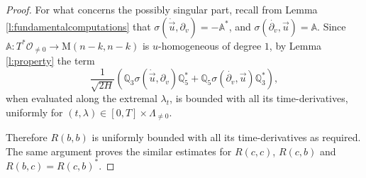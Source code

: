 \documentclass[11pt,a4paper]{article}
\theoremstyle{plain}
\theoremstyle{definition}
\theoremstyle{remark}
\numberwithin{equation}{section}
\newcommand{\A}{\mathbb{A}}
\newcommand{\Q}{\mathbb{Q}}
\begin{document}
\begin{proof}
For what concerns the possibly singular part, recall from Lemma \ref{l:fundamentalcomputations} that $\sigma(\dot{\vec{u}},\partial_v) = -\A^*$, and $\sigma(\dot{\partial_v},\vec{u}) = \A$. Since $\A : T^*\mathcal{O}_{\neq 0} \to \mathrm{M}(n-k,n-k)$ is $u$-homogeneous of degree $1$, by Lemma \ref{l:property} the term
\begin{equation}
\frac{1}{\sqrt{2H}}\left(\Q_3 \sigma(\dot{\vec{u}},\partial_v)\Q_5^* + \Q_5 \sigma(\dot{\partial_v},\vec{u}) \Q_3^*\right),
\end{equation}
when evaluated along the extremal $\lambda_t$, is bounded with all its time-derivatives, uniformly for $(t,\lambda)\in [0,T]\times \Lambda_{\neq 0}$.

Therefore $R(b,b)$ is uniformly bounded with all its time-derivatives as required. The same argument proves the similar estimates for $R(c,c)$, $R(c,b)$ and $R(b,c)= R(c,b)^*$. 


\end{proof}
\end{document}
